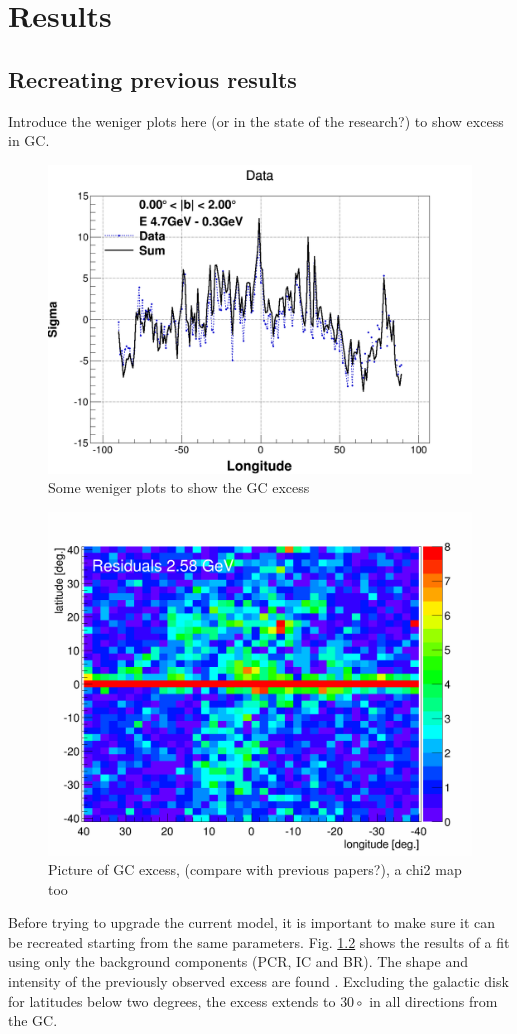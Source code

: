 \chapter{Results}
\label{ch:results}
%

\section{Recreating previous results}
\label{sec:results_recreating_prev_res}

Introduce the weniger plots here (or in the state of the research?) to show excess in GC.
\begin{figure}[h]
  \centering
  \includegraphics[width=.5\linewidth]{pic/results/Weniger_SUM_b0-2_E4,7-0,31GeV.png}
  \caption{Some weniger plots to show the GC excess}
  \label{fig:weniger_plot}
\end{figure}



\begin{figure}[h]
  \centering
  \includegraphics[width=.5\linewidth]{pic/results/BKGonly_halo_residuals.png}
  \caption{Picture of GC excess, (compare with previous papers?), a chi2 map too}
  \label{fig:original_GC_excess}
\end{figure}

Before trying to upgrade the current model, it is important to make sure it can be recreated starting from the same parameters. Fig. \ref{fig:original_GC_excess} shows the results of a fit using only the background components (PCR, IC and BR). The shape and intensity of the previously observed excess are found . Excluding the galactic disk for latitudes below two degrees, the excess extends to $30\circ$ in all directions from the GC.

